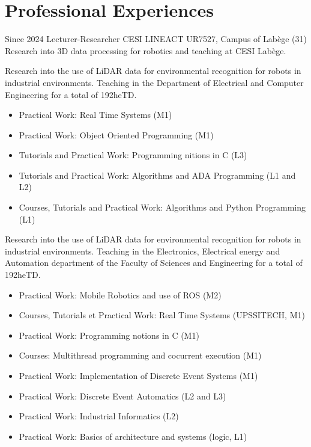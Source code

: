 \documentclass[11pt,a4paper,sans]{moderncv}         %
\begin{document}
\section{Professional Experiences}
\cventry
{Since 2024}
{Lecturer-Researcher}
{CESI LINEACT UR7527, Campus of Lab\`ege (31)}
{}
{}
{
  Research into 3D data processing for robotics and teaching at CESI Lab\`ege.
}
{
Research into the use of LiDAR data for environmental recognition for robots in industrial environments. 
Teaching in the Department of Electrical and Computer Engineering for a total of 192heTD.
\begin{itemize}
  \item Practical Work: Real Time Systems (M1)
  \item Practical Work: Object Oriented Programming (M1)
  \item Tutorials and Practical Work: Programming nitions in C (L3)
  \item Tutorials and Practical Work: Algorithms and ADA Programming (L1 and L2)
  \item Courses, Tutorials and Practical Work: Algorithms and Python Programming (L1)
\end{itemize}
}
{
Research into the use of LiDAR data for environmental recognition for robots in industrial environments. 
Teaching in the Electronics, Electrical energy and Automation department of the Faculty of Sciences and Engineering for a total of 192heTD.
\begin{itemize}
  \item Practical Work: Mobile Robotics and use of ROS (M2)
  \item Courses, Tutorials et Practical Work: Real Time Systems (UPSSITECH, M1)
  \item Practical Work: Programming notions in C (M1)
  \item Courses: Multithread programming and cocurrent execution (M1)
  \item Practical Work: Implementation of Discrete Event Systems (M1)
  \item Practical Work: Discrete Event Automatics (L2 and L3)
  \item Practical Work: Industrial Informatics (L2)
  \item Practical Work: Basics of architecture and systems (logic, L1)
\end{itemize}
}
\end{document}
